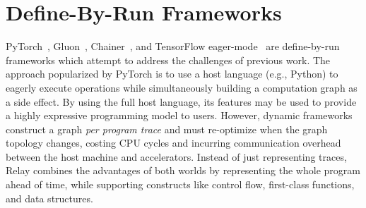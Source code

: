\section{Define-By-Run Frameworks}
PyTorch~\citep{pytorch_ad}, Gluon~\citep{gluon}, Chainer~\citep{chainer_learningsys2015},
    and TensorFlow eager-mode~\citep{tf_eager} are define-by-run frameworks which
    attempt to address the challenges of previous work.
The approach popularized by PyTorch is to use a host language (e.g., Python)
    to eagerly execute operations while simultaneously building a computation graph
    as a side effect.
By using the full host language,
  its features may be used to provide a highly expressive programming model to users.
However, dynamic frameworks construct a graph \textit{per program trace} and must re-optimize when
    the graph topology changes, costing CPU cycles and incurring communication overhead between the host
    machine and accelerators.
Instead of just representing traces, Relay combines the advantages of both worlds by
    representing the whole program ahead of time,
    while supporting constructs like control flow, first-class functions, and data structures.





